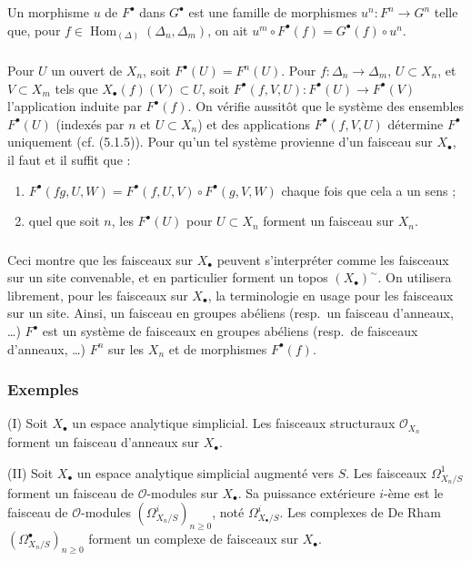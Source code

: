 \documentclass[11pt]{amsart}
\theoremstyle{plain}
\theoremstyle{definition}
\DeclareMathOperator{\Hom}{Hom}
\newcommand{\cO}{\mathcal{O}}
\begin{document}
Un morphisme $u$ de $F^\bullet$ dans $G^\bullet$ est une famille de morphismes $u^n : F^n \to G^n$ telle
que, pour $f \in \Hom_{(\Delta)}(\Delta_n, \Delta_m)$, on ait $u^m \circ F^\bullet(f) = G^\bullet(f) \circ u^n$.

\subsubsection{}
Pour $U$ un ouvert de $X_n$, soit $F^\bullet(U) = F^n(U)$. Pour $f : \Delta_n \to \Delta_m$, $U \subset X_n$,
et $V \subset X_m$ tels que $X_\bullet(f)(V) \subset U$, soit $F^\bullet(f, V, U) : F^\bullet(U) \to F^\bullet(V)$ l'application
induite par $F^\bullet(f)$. On v\'erifie aussit\^ot que le syst\`eme des ensembles $F^\bullet(U)$ (index\'es par $n$
et $U \subset X_n$) et des applications $F^\bullet(f, V, U)$ d\'etermine $F^\bullet$ uniquement (cf. (5.1.5)).
Pour qu'un tel syst\`eme provienne d'un faisceau sur $X_\bullet$, il faut et il suffit que :
\begin{enumerate}
\item[(a)] $F^\bullet(fg, U, W) = F^\bullet(f, U, V) \circ F^\bullet(g, V, W)$ chaque fois que cela a un sens ;
\item[(b)] quel que soit $n$, les $F^\bullet(U)$ pour $U \subset X_n$ forment un faisceau sur $X_n$.
\end{enumerate}

\subsubsection{}
Ceci montre que les faisceaux sur $X_\bullet$ peuvent s'interpr\'eter comme les
faisceaux sur un site convenable, et en particulier forment un topos $(X_\bullet)^\sim$. On utilisera
librement, pour les faisceaux sur $X_\bullet$, la terminologie en usage pour les faisceaux sur
un site. Ainsi, un faisceau en groupes ab\'eliens (resp.\ un faisceau d'anneaux, \ldots) $F^\bullet$
est un syst\`eme de faisceaux en groupes ab\'eliens (resp.\ de faisceaux d'anneaux, \ldots)
$F^n$ sur les $X_n$ et de morphismes $F^\bullet(f)$.

\subsubsection{Exemples}

(I) Soit $X_\bullet$ un espace analytique simplicial. Les faisceaux structuraux $\cO_{X_n}$ forment un faisceau d'anneaux sur $X_\bullet$.

(II) Soit $X_\bullet$ un espace analytique simplicial augment\'e vers $S$. Les faisceaux $\Omega^1_{X_n/S}$
forment un faisceau de $\cO$-modules sur $X_\bullet$. Sa puissance ext\'erieure $i$-\`eme est le faisceau
de $\cO$-modules $(\Omega^i_{X_n/S})_{n \geq 0}$, not\'e $\Omega^i_{X_\bullet/S}$. Les complexes de De Rham $(\Omega^\bullet_{X_n/S})_{n \geq 0}$ forment
un complexe de faisceaux sur $X_\bullet$.
\end{document}
